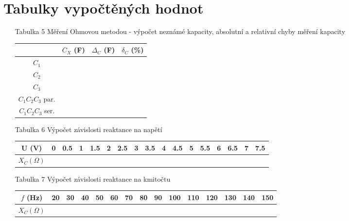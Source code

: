 \documentclass[a4paper,12pt]{report}
\begin{document}
\chapter*{Tabulky vypočtěných hodnot}
\begin{itemize}
 \item [Tabulka 5]{Měření Ohmovou metodou - výpočet neznámé kapacity, absolutní a relativní chyby měření kapacity}
	\begin{center}
		\begin{tabular}{|c|c|c|c|}
\hline
                 & $C_X$ (F) & $\Delta_C$ (F) & $\delta_C$ (\%) \\\hline
$C_1$            &           &                &                 \\\hline
$C_2$            &           &                &                 \\\hline
$C_3$            &           &                &                 \\\hline
$C_1C_2C_3$ par. &           &                &                 \\\hline
$C_1C_2C_3$ ser. &           &                &                 \\\hline
		\end{tabular}
	\end{center}
 \item[Tabulka 6]{Výpočet závislosti reaktance na napětí}
	\begin{center}
		\begin{tabular}{|c|c|c|c|c|c|c|c|c|c|c|c|c|c|c|c|c|}
\hline
U (V)          & 0 & 0.5 & 1 & 1.5 & 2 & 2.5 & 3 & 3.5 & 4 & 4.5 & 5 & 5.5 & 6 & 6.5 & 7 & 7.5 \\\hline
$X_C (\Omega)$ &   &     &   &     &   &     &   &     &   &     &   &     &   &     &   &     \\\hline
		\end{tabular}
	\end{center}
 \item[Tabulka 7]{Výpočet závislosti reaktance na kmitočtu}
	\begin{center}
		\begin{tabular}{|c|c|c|c|c|c|c|c|c|c|c|c|c|c|c|}
\hline
$f$ (Hz)       & 20 & 30 & 40 & 50 & 60 & 70 & 80 & 90 & 100 & 110 & 120 & 130 & 140 & 150 \\\hline
$X_C (\Omega)$ &    &    &    &    &    &    &    &    &     &     &     &     &     &     \\\hline
		\end{tabular}
	\end{center}
\end{itemize}
\newpage
\end{document}
